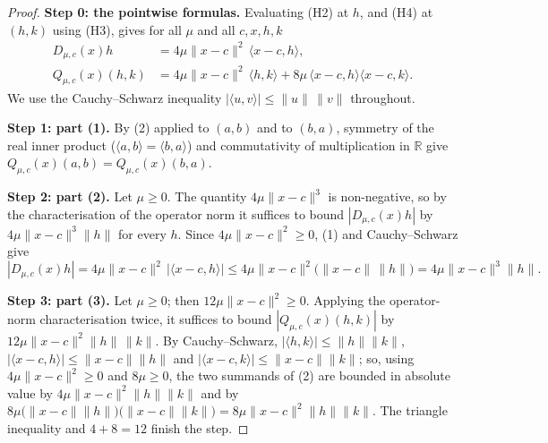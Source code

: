 \begin{proof}
\noindent\textbf{Step 0: the pointwise formulas.} Evaluating (H2) at $h$, and (H4) at
$(h,k)$ using (H3), gives for all $\mu$ and all $c,x,h,k$
\begin{align}
 D_{\mu,c}(x)h&=4\mu\|x-c\|^{2}\,\langle x-c,h\rangle, \tag{1}\\
 Q_{\mu,c}(x)(h,k)&=4\mu\|x-c\|^{2}\,\langle h,k\rangle
   +8\mu\,\langle x-c,h\rangle\langle x-c,k\rangle. \tag{2}
\end{align}
We use the Cauchy--Schwarz inequality $|\langle u,v\rangle|\le\|u\|\,\|v\|$ throughout.

\medskip\noindent\textbf{Step 1: part (1).} By (2) applied to $(a,b)$ and to $(b,a)$,
symmetry of the real inner product ($\langle a,b\rangle=\langle b,a\rangle$) and
commutativity of multiplication in $\mathbb R$ give
$Q_{\mu,c}(x)(a,b)=Q_{\mu,c}(x)(b,a)$.

\medskip\noindent\textbf{Step 2: part (2).} Let $\mu\ge0$. The quantity
$4\mu\|x-c\|^{3}$ is non-negative, so by the characterisation of the operator norm it
suffices to bound $|D_{\mu,c}(x)h|$ by $4\mu\|x-c\|^{3}\|h\|$ for every $h$. Since
$4\mu\|x-c\|^{2}\ge0$, (1) and Cauchy--Schwarz give
\[
 |D_{\mu,c}(x)h|=4\mu\|x-c\|^{2}\,\big|\langle x-c,h\rangle\big|
  \le4\mu\|x-c\|^{2}\big(\|x-c\|\,\|h\|\big)=4\mu\|x-c\|^{3}\|h\| .
\]

\medskip\noindent\textbf{Step 3: part (3).} Let $\mu\ge0$; then $12\mu\|x-c\|^{2}\ge0$.
Applying the operator-norm characterisation twice, it suffices to bound
$|Q_{\mu,c}(x)(h,k)|$ by $12\mu\|x-c\|^{2}\|h\|\,\|k\|$. By Cauchy--Schwarz,
$|\langle h,k\rangle|\le\|h\|\|k\|$, $|\langle x-c,h\rangle|\le\|x-c\|\|h\|$ and
$|\langle x-c,k\rangle|\le\|x-c\|\|k\|$; so, using $4\mu\|x-c\|^{2}\ge0$ and $8\mu\ge0$,
the two summands of (2) are bounded in absolute value by
$4\mu\|x-c\|^{2}\|h\|\|k\|$ and by
$8\mu\big(\|x-c\|\|h\|\big)\big(\|x-c\|\|k\|\big)=8\mu\|x-c\|^{2}\|h\|\|k\|$. The triangle
inequality and $4+8=12$ finish the step.


\end{proof}
